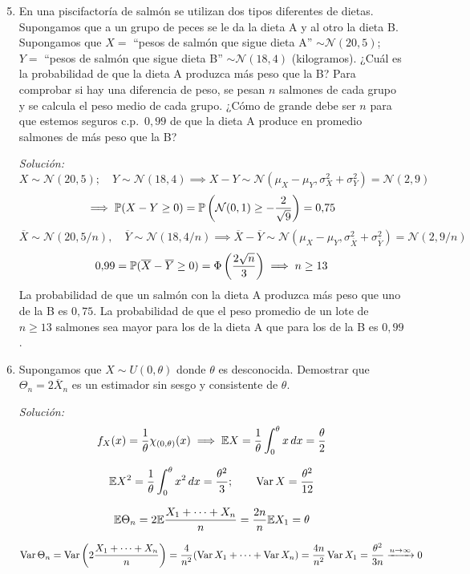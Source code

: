 \begin{enumerate}
  \setcounter{enumi}{4}
  \item En una piscifactoría de salmón se utilizan dos tipos diferentes de dietas. Supongamos que a un grupo de peces se le da la dieta A y al otro la dieta B. Supongamos que $X =$ ``pesos de salmón que sigue dieta A'' $\sim \mathcal{N}(20, 5)$; $Y =$ ``pesos de salmón que sigue dieta B'' $\sim \mathcal{N}(18, 4)$ (kilogramos). ¿Cuál es la probabilidad de que la dieta A produzca más peso que la B? Para comprobar si hay una diferencia de peso, se pesan $n$ salmones de cada grupo y se calcula el peso medio de cada grupo. ¿Cómo de grande debe ser $n$ para que estemos seguros c.p.\ $0{,}99$ de que la dieta A produce en promedio salmones de más peso que la B?

  \smallskip
  \noindent\textit{Solución:}
  \[
    X \sim \mathcal{N}(20, 5); \quad Y \sim \mathcal{N}(18, 4) \implies X - Y \sim \mathcal{N}(\mu_X - \mu_Y, \sigma_X^2 + \sigma_Y^2) = \mathcal{N}(2, 9)\]
    \[ \implies \mathbb{P}(X - Y \geq 0) = \mathbb{P}\left(\mathcal{N}(0,1) \geq -\frac{2}{\sqrt{9}}\right) = 0{,}75
  \]
  \[
    \overline{X} \sim \mathcal{N}(20, 5/n), \quad \overline{Y} \sim \mathcal{N}(18, 4/n) \implies \overline{X} - \overline{Y} \sim \mathcal{N}(\mu_X - \mu_Y, \sigma_{\overline{X}}^2 + \sigma_{\overline{Y}}^2) = \mathcal{N}(2, 9/n)
  \]
  \[
    0{,}99 = \mathbb{P}(\overline{X} - \overline{Y} \geq 0) = \Phi\left(\frac{2\sqrt{n}}{3}\right) \implies n \geq 13
  \]
  La probabilidad de que un salmón con la dieta A produzca más peso que uno de la B es $0{,}75$. La probabilidad de que el peso promedio de un lote de $n \geq 13$ salmones sea mayor para los de la dieta A que para los de la B es $0{,}99$.

  \item Supongamos que $X \sim U(0, \theta)$ donde $\theta$ es desconocida. Demostrar que $\Theta_n = 2\overline{X}_n$ es un estimador sin sesgo y consistente de $\theta$.

  \smallskip
  \noindent\textit{Solución:}
  \[
    f_X(x) = \frac{1}{\theta}\chi_{(0,\theta)}(x) \implies \mathbb{E} X = \frac{1}{\theta}\int_0^\theta x\,dx = \frac{\theta}{2}
  \]
 
  \[
    \mathbb{E} X^2 = \frac{1}{\theta}\int_0^\theta x^2\,dx = \frac{\theta^2}{3}; \qquad \operatorname{Var} X = \frac{\theta^2}{12}
  \]
  
  \[
    \mathbb{E}\Theta_n = 2\mathbb{E}\frac{X_1 + \dots + X_n}{n} = \frac{2n}{n}\mathbb{E} X_1 = \theta
  \]
 
  \[
    \operatorname{Var}\Theta_n = \operatorname{Var}\left(2\frac{X_1 + \dots + X_n}{n}\right) = \frac{4}{n^2}(\operatorname{Var} X_1 + \dots + \operatorname{Var} X_n) = \frac{4n}{n^2}\operatorname{Var} X_1 = \frac{\theta^2}{3n} \xrightarrow{n\to\infty} 0
  \]
 

\end{enumerate}
